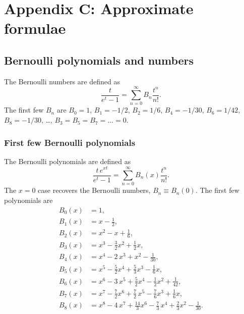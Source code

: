 \documentclass[aip,jcp,preprint,notitlepage, superscriptaddress]{revtex4-1}
\begin{document}
\section{Appendix C: Approximate formulae}




\subsection{Bernoulli polynomials and numbers}



The Bernoulli numbers are defined as
%
\begin{equation}
  \frac{ t }
  {e^t - 1}
=
\sum_{n = 0}^\infty
  B_n \frac{ t^n } { n! }.
\label{eq:Bernoulli_number}
\end{equation}
%
The first few $B_n$ are\cite{
  whittaker, arfken, abramowitz, wang_specfunc}
$B_0 = 1$,
$B_1 = -1/2$,
$B_2 = 1/6$,
$B_4 = -1/30$,
$B_6 = 1/42$,
$B_8 = -1/30$,
\dots,
$B_3 = B_5 = B_7 = \dots = 0$.



\subsubsection{First few Bernoulli polynomials}



The Bernoulli polynomials are defined as
%
\begin{equation}
  \frac{ t \, e^{x t} }
  {e^t - 1}
=
\sum_{n = 0}^\infty
  B_n(x) \frac{ t^n } { n! }.
\label{eq:Bernoulli_polynomial}
\end{equation}
%
The $x = 0$ case
recovers the Bernoulli numbers,
$B_n \equiv B_n(0)$.
%
The first few polynomials are\cite{
  whittaker, arfken, abramowitz, wang_specfunc}
\begin{align*}
B_0(x) &= 1, \\
B_1(x) &= x - \frac 1 2, \\
B_2(x) &= x^2 - x + \frac 1 6, \\
B_3(x) &= x^3 - \frac 3 2 x^2 + \frac 1 2 x, \\
B_4(x) &= x^4 - 2 \, x^3 + x^2 - \frac{1}{30}, \\
B_5(x) &= x^5 - \frac 5 2 x^4 + \frac 5 3 x^3 - \frac{1}{6} x, \\
B_6(x) &= x^6 - 3 \, x^5 + \frac 5 2 x^4 - \frac 1 2 x^2 + \frac{1}{42}, \\
B_7(x) &= x^7 - \frac 7 2 x^6 + \frac 7 2 \, x^5 - \frac 7 6 x^3 + \frac 1 6 x, \\
B_8(x) &= x^8 - 4 \, x^7 + \frac{14} 3 x^6 - \frac 7 3 \, x^4 + \frac 2 3 x^2 - \frac{1}{30}. \\
\end{align*}
\end{document}
